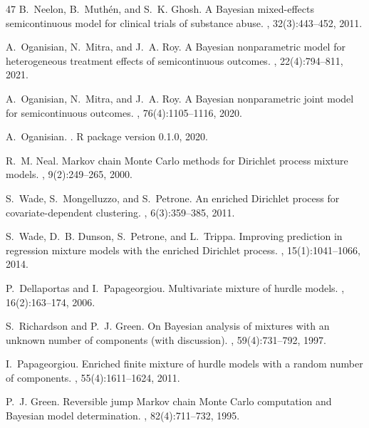 \documentclass[11pt, a4paper]{article}
\begin{document}
\begin{thebibliography}{47}
B.~Neelon, B.~Muth{\'e}n, and S.~K. Ghosh.
\newblock A Bayesian mixed-effects semicontinuous model for clinical trials of substance abuse.
, 32(3):443--452, 2011.

A.~Oganisian, N.~Mitra, and J.~A. Roy.
\newblock A Bayesian nonparametric model for heterogeneous treatment effects of semicontinuous outcomes.
, 22(4):794--811, 2021.

A.~Oganisian, N.~Mitra, and J.~A. Roy.
\newblock A Bayesian nonparametric joint model for semicontinuous outcomes.
, 76(4):1105--1116, 2020.

A.~Oganisian.
.
\newblock R package version 0.1.0, 2020.

R.~M. Neal.
\newblock Markov chain Monte Carlo methods for Dirichlet process mixture models.
, 9(2):249--265, 2000.

S.~Wade, S.~Mongelluzzo, and S.~Petrone.
\newblock An enriched Dirichlet process for covariate-dependent clustering.
, 6(3):359--385, 2011.

S.~Wade, D.~B. Dunson, S.~Petrone, and L.~Trippa.
\newblock Improving prediction in regression mixture models with the enriched Dirichlet process.
, 15(1):1041--1066, 2014.

P.~Dellaportas and I.~Papageorgiou.
\newblock Multivariate mixture of hurdle models.
, 16(2):163--174, 2006.

S.~Richardson and P.~J. Green.
\newblock On Bayesian analysis of mixtures with an unknown number of components (with discussion).
, 59(4):731--792, 1997.

I.~Papageorgiou.
\newblock Enriched finite mixture of hurdle models with a random number of components.
, 55(4):1611--1624, 2011.

P.~J. Green.
\newblock Reversible jump Markov chain Monte Carlo computation and Bayesian model determination.
, 82(4):711--732, 1995.


\end{thebibliography}
\end{document}
